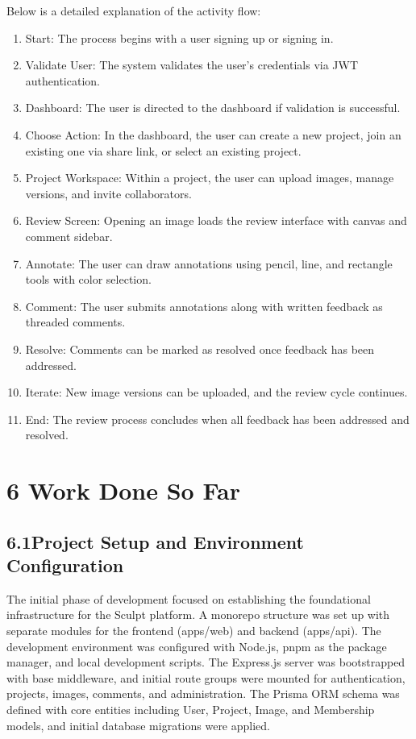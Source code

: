 \documentclass[12pt,a4paper]{article}
\begin{document}
Below is a detailed explanation of the activity flow:
\begin{enumerate}
    \item Start: The process begins with a user signing up or signing in.
    \item Validate User: The system validates the user's credentials via JWT authentication.
    \item Dashboard: The user is directed to the dashboard if validation is successful.
    \item Choose Action: In the dashboard, the user can create a new project, join an existing one via share link, or select an existing project.
    \item Project Workspace: Within a project, the user can upload images, manage versions, and invite collaborators.
    \item Review Screen: Opening an image loads the review interface with canvas and comment sidebar.
    \item Annotate: The user can draw annotations using pencil, line, and rectangle tools with color selection.
    \item Comment: The user submits annotations along with written feedback as threaded comments.
    \item Resolve: Comments can be marked as resolved once feedback has been addressed.
    \item Iterate: New image versions can be uploaded, and the review cycle continues.
    \item End: The review process concludes when all feedback has been addressed and resolved.
\end{enumerate}

\section{6 Work Done So Far}

\subsection{6.1\quad Project Setup and Environment Configuration}

The initial phase of development focused on establishing the foundational infrastructure for the Sculpt platform. A monorepo structure was set up with separate modules for the frontend (apps/web) and backend (apps/api). The development environment was configured with Node.js, pnpm as the package manager, and local development scripts. The Express.js server was bootstrapped with base middleware, and initial route groups were mounted for authentication, projects, images, comments, and administration. The Prisma ORM schema was defined with core entities including User, Project, Image, and Membership models, and initial database migrations were applied.
\end{document}
